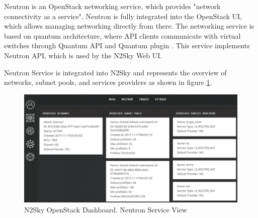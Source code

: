 Neutron is an OpenStack networking service, which provides "network connectivity as a service". Neutron is fully integrated into the OpenStack UI, which allows managing networking directly from there. The networking service is based on quantum architecture, where API clients communicate with virtual switches through Quantum API and Quantum plugin \cite{neutron}. This service implements Neutron API, which is used by the N2Sky Web UI. 

Neutron Service is integrated into N2Sky and represents the overview of networks, subnet pools, and services providers as shown in figure \ref{fig:openstack_neutron}.

\begin{figure}[H]
\begin{center}
  \includegraphics[width=\linewidth]{components/4/pics/openstack_neutron.png}
  \caption{N2Sky OpenStack Dashboard. Neutron Service View}
  \label{fig:openstack_neutron}
\end{center}
\end{figure}

